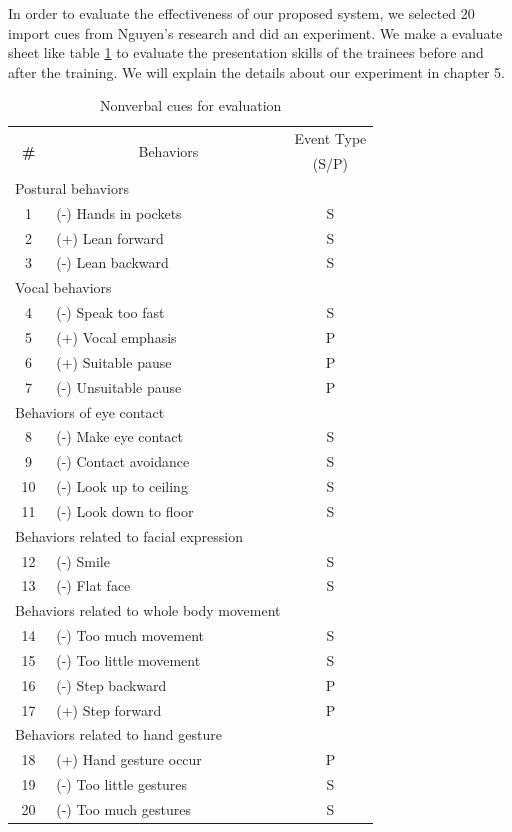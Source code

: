 \par In order to evaluate the effectiveness of our proposed system, we selected 20 import cues from Nguyen's research and did an experiment. We make a evaluate sheet like table \ref{tab:evalutioncues} to evaluate the presentation skills of the trainees before and after the training. We will explain the details about our experiment in chapter 5.

\begin{table}[]
\centering
\caption{Nonverbal cues for evaluation}
\label{tab:evalutioncues}
\begin{tabular}{clc}
\hline
\multirow{3}{*}{\textbf{\#}} & \multicolumn{1}{c}{\multirow{3}{*}{Behaviors}} & \multirow{2}{*}{Event Type} \\
 & \multicolumn{1}{c}{} &  \\
 & \multicolumn{1}{c}{} & (S/P) \\ \hline
\multicolumn{2}{l}{Postural behaviors} &  \\
1 & (-) Hands in pockets & S \\
2 & (+) Lean forward & S \\
3 & (-) Lean backward & S \\ \hline
\multicolumn{2}{l}{Vocal behaviors} &  \\
4 & (-) Speak too fast & S \\
5 & (+) Vocal emphasis & P \\
6 & (+) Suitable pause & P \\
7 & (-) Unsuitable pause & P \\ \hline
\multicolumn{2}{l}{Behaviors of eye contact} &  \\
8 & (-) Make eye contact & S \\
9 & (-) Contact avoidance & S \\
10 & (-) Look up to ceiling & S \\
11 & (-) Look down to floor & S \\ \hline
\multicolumn{2}{l}{Behaviors related to facial expression} &  \\
12 & (-) Smile & S \\
13 & (-) Flat face & S \\ \hline
\multicolumn{2}{l}{Behaviors related to whole body movement} &  \\
14 & (-) Too much movement & S \\
15 & (-) Too little movement & S \\
16 & (-) Step backward & P \\
17 & (+) Step forward & P \\ \hline
\multicolumn{3}{l}{Behaviors related to hand gesture} \\
18 & (+) Hand gesture occur & P \\
19 & (-) Too little gestures & S \\
20 & (-) Too much gestures & S \\ \hline
\end{tabular}
\end{table}
